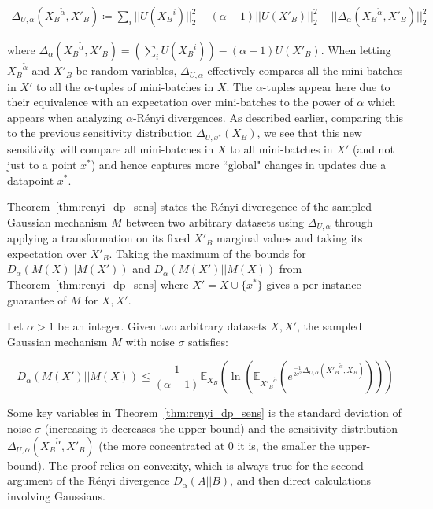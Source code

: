 \begin{multline*}
\Delta_{U,\alpha}({X_{B}}^{\tilde \alpha}, X'_B) \coloneqq \sum_{i} ||U({X_B}^i)||_2^2 - (\alpha-1) ||U(X'_B)||_2^2 - ||\Delta_{\alpha}({X_B}^{\tilde \alpha},X'_B)||_2^2
\end{multline*}


where $\Delta_{\alpha}({X_B}^{\tilde \alpha},X'_B) = (\sum_{i} U({X_B}^i)) - (\alpha - 1) U(X'_B)$. When letting ${X_{B}}^{\tilde \alpha}$ and $X'_B$ be random variables, $\Delta_{U,\alpha}$ effectively compares all the mini-batches in $X'$ to all the $\alpha$-tuples of mini-batches in $X$. The $\alpha$-tuples appear here due to their equivalence with an expectation over mini-batches to the power of $\alpha$ which appears when analyzing $\alpha$-R\'enyi divergences. As described earlier, comparing this to the previous sensitivity distribution $\Delta_{U,x^*}(X_B)$, we see that this new sensitivity will compare all mini-batches in $X$ to all mini-batches in $X'$ (and not just to a point $x^*$) and hence captures more ``global" changes in updates due a datapoint $x^*$.




Theorem~\ref{thm:renyi_dp_sens} states the R\'enyi diveregence of the sampled Gaussian mechanism $M$ between two arbitrary datasets using $\Delta_{U, \alpha}$ through applying a transformation on its fixed $X'_B$ marginal values and taking its expectation over $X'_B$. Taking the maximum of the bounds for $D_{\alpha}(M(X)||M(X'))$ and $D_{\alpha}(M(X')||M(X))$ from Theorem~\ref{thm:renyi_dp_sens} where $X' = X \cup \{x^*\}$ gives a per-instance guarantee of $M$ for $X,X'$.




\begin{theorem}
\label{thm:renyi_dp_sens}
Let $\alpha > 1$ be an integer. Given two arbitrary datasets $X,X'$, the sampled Gaussian mechanism $M$ with noise $\sigma$ satisfies: 

$$D_{\alpha}(M(X')||M(X)) \leq \frac{1}{(\alpha-1)} \mathbb{E}_{X_B} (\ln (\mathbb{E}_{{X'_{B}}^{\tilde \alpha}}(e^{\frac{-1}{2\sigma^2}\Delta_{U,\alpha}({X'_{B}}^{\tilde \alpha}, X_B)})))$$



\end{theorem}



Some key variables in Theorem~\ref{thm:renyi_dp_sens} is the standard deviation of noise $\sigma$ (increasing it decreases the upper-bound) and the sensitivity distribution $\Delta_{U,\alpha}({X_{B}}^{\tilde \alpha}, X'_B)$ (the more concentrated at $0$ it is, the smaller the upper-bound). The proof relies on convexity, which is always true for the second argument of the R\'enyi divergence $D_{\alpha}(A||B)$, and then direct calculations involving Gaussians. %

